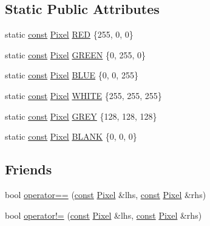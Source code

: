 \subsection*{Static Public Attributes}
\begin{DoxyCompactItemize}
\item 
static \hyperlink{functions__c_8js_afacfd9c985d225bb07483b887a801b6f}{const} \hyperlink{class_pixel}{Pixel} \hyperlink{class_pixel_a0873aef3100f5b2400ee7ca185bf263a}{R\+ED} \{255, 0, 0\}
\item 
static \hyperlink{functions__c_8js_afacfd9c985d225bb07483b887a801b6f}{const} \hyperlink{class_pixel}{Pixel} \hyperlink{class_pixel_af1e95f87b82dedb916c81f427b3eb68a}{G\+R\+E\+EN} \{0, 255, 0\}
\item 
static \hyperlink{functions__c_8js_afacfd9c985d225bb07483b887a801b6f}{const} \hyperlink{class_pixel}{Pixel} \hyperlink{class_pixel_a64e919862b4e618715e6d6dba7671112}{B\+L\+UE} \{0, 0, 255\}
\item 
static \hyperlink{functions__c_8js_afacfd9c985d225bb07483b887a801b6f}{const} \hyperlink{class_pixel}{Pixel} \hyperlink{class_pixel_a12c08beec64c8d57bdd9ef3b49244aa3}{W\+H\+I\+TE} \{255, 255, 255\}
\item 
static \hyperlink{functions__c_8js_afacfd9c985d225bb07483b887a801b6f}{const} \hyperlink{class_pixel}{Pixel} \hyperlink{class_pixel_a67edde6c97818a595235295f750b50fd}{G\+R\+EY} \{128, 128, 128\}
\item 
static \hyperlink{functions__c_8js_afacfd9c985d225bb07483b887a801b6f}{const} \hyperlink{class_pixel}{Pixel} \hyperlink{class_pixel_a77c8aab7dad0995df6fdc8ccf65e92ee}{B\+L\+A\+NK} \{0, 0, 0\}
\end{DoxyCompactItemize}
\subsection*{Friends}
\begin{DoxyCompactItemize}
\item 
bool \hyperlink{class_pixel_aacd4ab1e37e7b6507b3580d2a3cd0fd9}{operator==} (\hyperlink{functions__c_8js_afacfd9c985d225bb07483b887a801b6f}{const} \hyperlink{class_pixel}{Pixel} \&lhs, \hyperlink{functions__c_8js_afacfd9c985d225bb07483b887a801b6f}{const} \hyperlink{class_pixel}{Pixel} \&rhs)
\item 
bool \hyperlink{class_pixel_a96c765b304a1ef8aad3e454b02d21de5}{operator!=} (\hyperlink{functions__c_8js_afacfd9c985d225bb07483b887a801b6f}{const} \hyperlink{class_pixel}{Pixel} \&lhs, \hyperlink{functions__c_8js_afacfd9c985d225bb07483b887a801b6f}{const} \hyperlink{class_pixel}{Pixel} \&rhs)
\end{DoxyCompactItemize}


